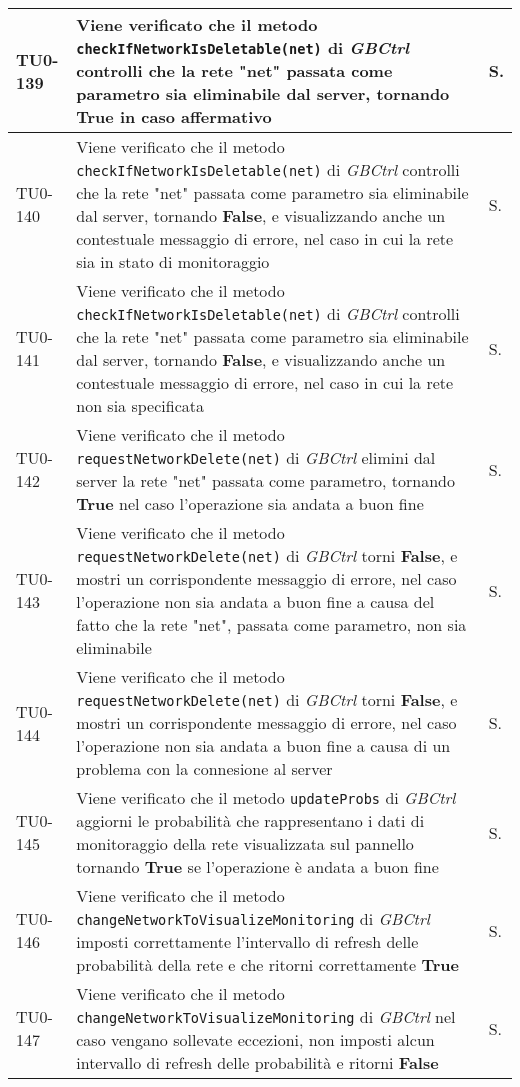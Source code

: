 \begin{longtable}{|C{.15\textwidth}|m{.66\textwidth}|C{.10\textwidth}|}
\hline
{}TU0-139 & Viene verificato che il metodo \texttt{checkIfNetworkIsDeletable(net)} di \textit{GBCtrl} controlli che la rete "net" passata come parametro sia eliminabile dal server, tornando \textbf{True} in caso affermativo & S.\\
\hline
TU0-140 & Viene verificato che il metodo \texttt{checkIfNetworkIsDeletable(net)} di \textit{GBCtrl} controlli che la rete "net" passata come parametro sia eliminabile dal server, tornando \textbf{False}, e visualizzando anche un contestuale messaggio di errore, nel caso in cui la rete sia in stato di monitoraggio & S.\\
\hline
{}TU0-141 & Viene verificato che il metodo \texttt{checkIfNetworkIsDeletable(net)} di \textit{GBCtrl} controlli che la rete "net" passata come parametro sia eliminabile dal server, tornando \textbf{False}, e visualizzando anche un contestuale messaggio di errore, nel caso in cui la rete non sia specificata & S.\\
\hline
TU0-142 & Viene verificato che il metodo \texttt{requestNetworkDelete(net)} di \textit{GBCtrl} elimini dal server la rete "net" passata come parametro, tornando \textbf{True} nel caso l'operazione sia andata a buon fine & S.\\
\hline
{}TU0-143 & Viene verificato che il metodo \texttt{requestNetworkDelete(net)} di \textit{GBCtrl} torni \textbf{False}, e mostri un corrispondente messaggio di errore, nel caso l'operazione non sia andata a buon fine a causa del fatto che la rete "net", passata come parametro, non sia eliminabile & S.\\
\hline
TU0-144 & Viene verificato che il metodo \texttt{requestNetworkDelete(net)} di \textit{GBCtrl} torni \textbf{False}, e mostri un corrispondente messaggio di errore, nel caso l'operazione non sia andata a buon fine a causa di un problema con la connesione al server & S.\\
\hline
{}TU0-145 & Viene verificato che il metodo \texttt{updateProbs} di \textit{GBCtrl} aggiorni le probabilità che rappresentano i dati di monitoraggio della rete visualizzata sul pannello tornando \textbf{True} se l'operazione è andata a buon fine & S.\\
\hline
TU0-146 & Viene verificato che il metodo \texttt{changeNetworkToVisualizeMonitoring} di \textit{GBCtrl} imposti correttamente l'intervallo di refresh delle probabilità della rete e che ritorni correttamente \textbf{True} & S.\\
\hline
{}TU0-147 & Viene verificato che il metodo \texttt{changeNetworkToVisualizeMonitoring} di \textit{GBCtrl} nel caso vengano sollevate eccezioni, non imposti alcun intervallo di refresh delle probabilità e ritorni \textbf{False} & S.\\

\end{longtable}
